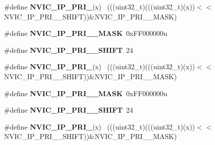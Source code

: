 \begin{DoxyCompactItemize}
\item 
\hypertarget{group___n_v_i_c___register___masks_gacf59d852d9b72b1e05e778d1ad3c465a}{}\#define {\bfseries N\+V\+I\+C\+\_\+\+I\+P\+\_\+\+P\+R\+I\+\_}(x)                                            ~(((uint32\+\_\+t)(((uint32\+\_\+t)(x))$<$$<$N\+V\+I\+C\+\_\+\+I\+P\+\_\+\+P\+R\+I\+\_\+\_\+\+S\+H\+I\+F\+T))\&N\+V\+I\+C\+\_\+\+I\+P\+\_\+\+P\+R\+I\+\_\+\_\+\+M\+A\+S\+K)\label{group___n_v_i_c___register___masks_gacf59d852d9b72b1e05e778d1ad3c465a}

\item 
\hypertarget{group___n_v_i_c___register___masks_ga49365dc3aff91af04da530f7f6bec195}{}\#define {\bfseries N\+V\+I\+C\+\_\+\+I\+P\+\_\+\+P\+R\+I\+\_\+\_\+\+M\+A\+S\+K}~0x\+F\+F000000u\label{group___n_v_i_c___register___masks_ga49365dc3aff91af04da530f7f6bec195}

\item 
\hypertarget{group___n_v_i_c___register___masks_gaa85a48e57435dc20f2f4addac07495fb}{}\#define {\bfseries N\+V\+I\+C\+\_\+\+I\+P\+\_\+\+P\+R\+I\+\_\+\_\+\+S\+H\+I\+F\+T}~24\label{group___n_v_i_c___register___masks_gaa85a48e57435dc20f2f4addac07495fb}

\item 
\hypertarget{group___n_v_i_c___register___masks_gaa8920f48e08a2b7e44168d59a9b72add}{}\#define {\bfseries N\+V\+I\+C\+\_\+\+I\+P\+\_\+\+P\+R\+I\+\_}(x)                                            ~(((uint32\+\_\+t)(((uint32\+\_\+t)(x))$<$$<$N\+V\+I\+C\+\_\+\+I\+P\+\_\+\+P\+R\+I\+\_\+\_\+\+S\+H\+I\+F\+T))\&N\+V\+I\+C\+\_\+\+I\+P\+\_\+\+P\+R\+I\+\_\+\_\+\+M\+A\+S\+K)\label{group___n_v_i_c___register___masks_gaa8920f48e08a2b7e44168d59a9b72add}

\item 
\hypertarget{group___n_v_i_c___register___masks_ga61474f269718967669f977cab7bd1390}{}\#define {\bfseries N\+V\+I\+C\+\_\+\+I\+P\+\_\+\+P\+R\+I\+\_\+\_\+\+M\+A\+S\+K}~0x\+F\+F000000u\label{group___n_v_i_c___register___masks_ga61474f269718967669f977cab7bd1390}

\item 
\hypertarget{group___n_v_i_c___register___masks_ga9cf132334a204ff4f6a55bc12ed41853}{}\#define {\bfseries N\+V\+I\+C\+\_\+\+I\+P\+\_\+\+P\+R\+I\+\_\+\_\+\+S\+H\+I\+F\+T}~24\label{group___n_v_i_c___register___masks_ga9cf132334a204ff4f6a55bc12ed41853}

\item 
\hypertarget{group___n_v_i_c___register___masks_ga737ae624a35e92ef147f1230ee502c37}{}\#define {\bfseries N\+V\+I\+C\+\_\+\+I\+P\+\_\+\+P\+R\+I\+\_}(x)                                            ~(((uint32\+\_\+t)(((uint32\+\_\+t)(x))$<$$<$N\+V\+I\+C\+\_\+\+I\+P\+\_\+\+P\+R\+I\+\_\+\_\+\+S\+H\+I\+F\+T))\&N\+V\+I\+C\+\_\+\+I\+P\+\_\+\+P\+R\+I\+\_\+\_\+\+M\+A\+S\+K)\label{group___n_v_i_c___register___masks_ga737ae624a35e92ef147f1230ee502c37}


\end{DoxyCompactItemize}
